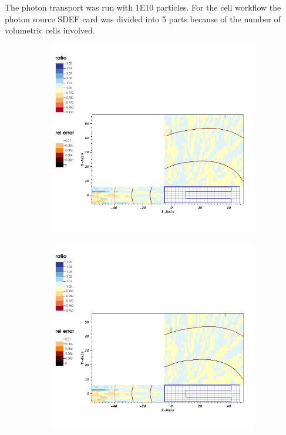 The photon transport was run with 1E10 particles. 
For the cell workflow the photon source SDEF card was divided into 5 parts 
because of the number of volumetric cells involved. 
\begin{figure}
    \begin{subfigure}{0.1\textwidth}
        \centering
        \includegraphics[scale=0.35, trim={0cm 20cm 31cm 2cm}, clip]{figs/dose_ratio_mat_aligned.png}
    \end{subfigure}
    \begin{subfigure}{0.1\textwidth}
        \centering
        \includegraphics[scale=0.35, trim={0cm 6.1cm 32cm 15cm}, clip]{figs/dose_ratio_mat_aligned.png}

\end{subfigure}
\end{figure}
